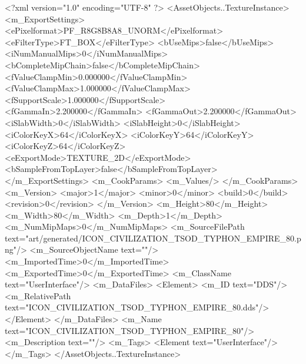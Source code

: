 <?xml version="1.0" encoding="UTF-8" ?>
<AssetObjects..TextureInstance>
	<m_ExportSettings>
		<ePixelformat>PF_R8G8B8A8_UNORM</ePixelformat>
		<eFilterType>FT_BOX</eFilterType>
		<bUseMips>false</bUseMips>
		<iNumManualMips>0</iNumManualMips>
		<bCompleteMipChain>false</bCompleteMipChain>
		<fValueClampMin>0.000000</fValueClampMin>
		<fValueClampMax>1.000000</fValueClampMax>
		<fSupportScale>1.000000</fSupportScale>
		<fGammaIn>2.200000</fGammaIn>
		<fGammaOut>2.200000</fGammaOut>
		<iSlabWidth>0</iSlabWidth>
		<iSlabHeight>0</iSlabHeight>
		<iColorKeyX>64</iColorKeyX>
		<iColorKeyY>64</iColorKeyY>
		<iColorKeyZ>64</iColorKeyZ>
		<eExportMode>TEXTURE_2D</eExportMode>
		<bSampleFromTopLayer>false</bSampleFromTopLayer>
	</m_ExportSettings>
	<m_CookParams>
		<m_Values/>
	</m_CookParams>
	<m_Version>
		<major>1</major>
		<minor>0</minor>
		<build>0</build>
		<revision>0</revision>
	</m_Version>
	<m_Height>80</m_Height>
	<m_Width>80</m_Width>
	<m_Depth>1</m_Depth>
	<m_NumMipMaps>0</m_NumMipMaps>
	<m_SourceFilePath text="art/generated/ICON_CIVILIZATION_TSOD_TYPHON_EMPIRE_80.png"/>
	<m_SourceObjectName text=""/>
	<m_ImportedTime>0</m_ImportedTime>
	<m_ExportedTime>0</m_ExportedTime>
	<m_ClassName text="UserInterface"/>
	<m_DataFiles>
		<Element>
			<m_ID text="DDS"/>
			<m_RelativePath text="ICON_CIVILIZATION_TSOD_TYPHON_EMPIRE_80.dds"/>
		</Element>
	</m_DataFiles>
	<m_Name text="ICON_CIVILIZATION_TSOD_TYPHON_EMPIRE_80"/>
	<m_Description text=""/>
	<m_Tags>
		<Element text="UserInterface"/>
	</m_Tags>
</AssetObjects..TextureInstance>
